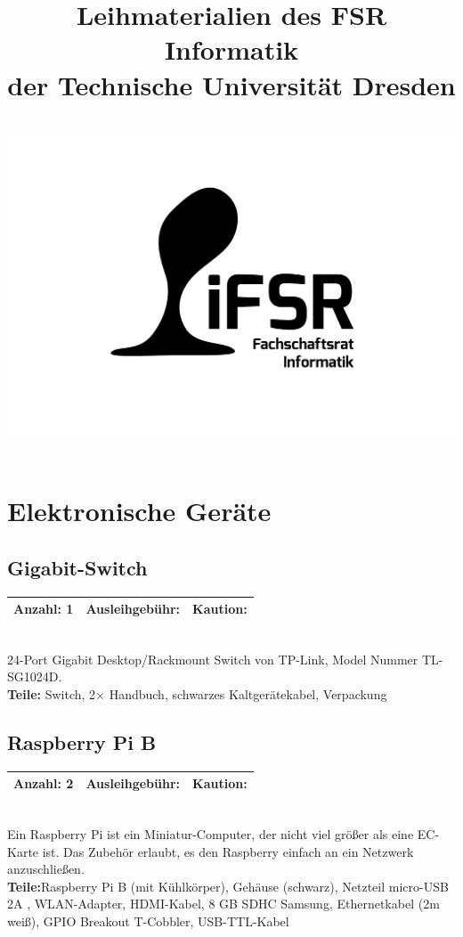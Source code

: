 \documentclass[a4paper]{article}
\newcommand{\iFSR}{FSR Informatik}
\newcommand{\infobox}[3] %
        {\par
                \begin{tabular}{| c | c | c| }
                \hline
                Anzahl: #1 & Ausleihgebühr: \EUR{#2} & Kaution: \EUR{#3}   \\
                \hline
                \end{tabular} \\
        }
\begin{document}
\title{\bf Leihmaterialien des \iFSR \\
        der Technische Universität Dresden \\~\\
         \includegraphics[width=.3\textwidth]{fsrlogo}
}

\maketitle


\tableofcontents


\pagebreak

\section{Elektronische Geräte}

\subsection{Gigabit-Switch}
\infobox{1}{1}{0}
24-Port Gigabit Desktop/Rackmount Switch von TP-Link, Model Nummer TL-SG1024D. \\
\textbf{ Teile:} Switch, 2$\times$ Handbuch, schwarzes Kaltgerätekabel, Verpackung


\subsection{Raspberry Pi B}
\infobox{2}{1}{0}
Ein Raspberry Pi ist ein Miniatur-Computer, der nicht viel größer als eine EC-Karte ist. Das Zubehör erlaubt, es den Raspberry einfach an ein Netzwerk anzuschließen. \\
\textbf{Teile:}Raspberry Pi B (mit Kühlkörper), Gehäuse (schwarz), Netzteil micro-USB 2A , WLAN-Adapter, HDMI-Kabel, 8 GB SDHC Samsung, Ethernetkabel (2m weiß), GPIO Breakout T-Cobbler, USB-TTL-Kabel 
\end{document}

